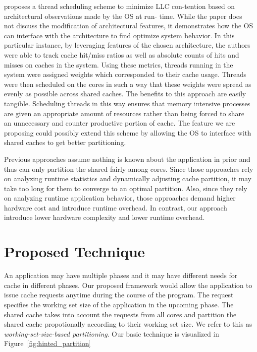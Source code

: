 \documentclass{acm_proc_article-sp}
\begin{document}
\cite{10.1109/MM.2008.48} proposes a thread scheduling scheme to minimize LLC 
con-tention based on 
architectural observations made by the OS at run- time. While the paper does 
not discuss the modification of architectural features, it demonstrates how the 
OS can interface with the architecture to find optimize system behavior. In this
 particular instance, by leveraging features of the chosen architecture, the 
authors were able to track cache hit/miss ratios as well as absolute counts of 
hits and misses on caches in the system. Using these metrics, threads running in
 the system were assigned weights which corresponded to their cache usage. 
Threads were then scheduled on the cores in such a way that these weights were 
spread as evenly as possible across shared caches. The benefits to this approach
 are easily tangible. Scheduling threads in this way ensures that memory 
intensive processes are given an appropriate amount of resources rather than 
being forced to share an unnecessary and counter productive portion of cache. 
The feature we are proposing could possibly extend this scheme by allowing the 
OS to interface with shared caches to get better partitioning.

Previous approaches assume nothing is known about the application in prior and 
thus can only partition the shared fairly among cores. Since those approaches 
rely on analyzing runtime statistics and dynamically adjusting cache partition,
it may take too long for them to converge to an optimal partition. Also, since 
they rely on analyzing runtime application behavior, those approaches demand 
higher hardware cost and introduce runtime overhead. In contrast, our approach
introduce lower hardware complexity and lower runtime overhead.

\section{Proposed Technique}

An application may have multiple phases and it may have different needs for 
cache in different phases. Our proposed framework would allow the application to issue 
cache requests anytime during the course of the program. The request specifies 
the working set size of the application in the upcoming phase. The shared cache
takes into account the requests from all cores and partition the shared cache
propotionally according to their working set size. We refer to this as 
\emph{working-set-size-based partitioning}. Our basic technique is visualized 
in Figure~\ref{fig:hinted_partition}
\end{document}
